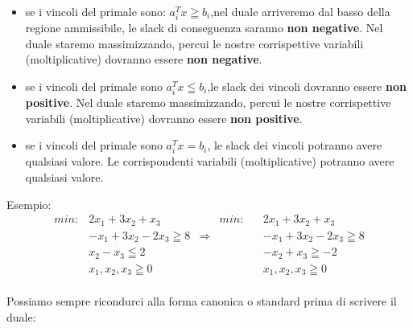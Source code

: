 \documentclass{article}
\begin{document}
\begin{center}
\end{center}
\begin{itemize}
\item se i vincoli del primale sono: \textbf{$a_i^Tx \geqq b_i$},nel duale arriveremo dal basso della regione ammissibile, le slack di conseguenza saranno \textbf{non negative}. Nel duale staremo massimizzando, percui le nostre corrispettive variabili (moltiplicative) dovranno essere \textbf{non negative}.
\item se i vincoli del primale sono \textbf{$a_i^Tx \leqq b_i$},le slack dei vincoli dovranno essere \textbf{non positive}. Nel duale staremo massimizzando, percui le nostre corrispettive variabili (moltiplicative) dovranno essere \textbf{non positive}.
\item se i vincoli del primale sono \textbf{$a_i^Tx = b_i$}, le slack dei vincoli potranno avere qualsiasi valore. Le corrispondenti variabili (moltiplicative) potranno avere qualsiasi valore.
\end{itemize}

Esempio:\\

\begin{align*}
min: &2x_1 + 3x_2 + x_3      &              &          min:& &2x_1 + 3x_2 + x_3\\
&-x_1 + 3x_2 - 2x_3 \geqq 8  & \Rightarrow  &                & &-x_1 + 3x_2 - 2x_3 \geqq 8\\
&x_2 - x_3 \leqq 2           &              & 			     & &-x_2 + x_3 \geqq -2\\
&x_1, x_2,x_3 \geqq 0        &              & 				 & &x_1, x_2,x_3 \geqq 0\\
\end{align*}

Possiamo sempre ricondurci alla forma canonica o standard prima di scrivere il duale:
\begin{center}
\end{center}
\end{document}
